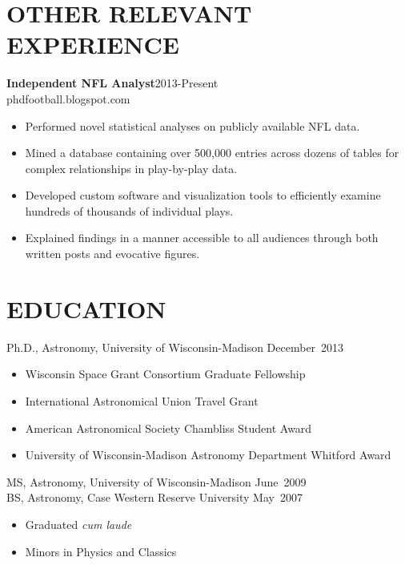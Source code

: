 \documentclass[11pt, margin]{res_hacked_long}
\begin{document}
\begin{resume}
\section{OTHER RELEVANT EXPERIENCE}
{\bf Independent NFL Analyst}\hfill\mbox{2013-Present}\\
phdfootball.blogspot.com
                  \vspace* {0.01 in}\begin{itemize} \itemsep -2pt
                    \item Performed novel statistical analyses on
                      publicly available NFL data.
                    \item Mined a database containing
                      over 500,000 entries across dozens of tables for complex relationships
                      in play-by-play data. 
                    \item Developed custom software and visualization
                      tools to efficiently examine hundreds
                      of thousands of individual plays. 
                    \item Explained findings in a manner accessible to all audiences through both written posts and evocative figures.
                  \end{itemize} 
\vspace{-0.1 in}

\section{EDUCATION} 
Ph.D., Astronomy, University of Wisconsin-Madison \hfill\mbox{December 2013}
\begin{itemize} \itemsep -2pt
\item Wisconsin Space Grant Consortium Graduate Fellowship
\item International Astronomical Union Travel Grant
\item American Astronomical Society Chambliss Student Award
\item University of Wisconsin-Madison Astronomy Department Whitford Award
\end{itemize}
\vspace{-0.15 in}
MS, Astronomy, University of Wisconsin-Madison \hfill\mbox{June 2009}\\
BS, Astronomy, Case Western Reserve University \hfill\mbox{May 2007} 
\begin{itemize} \itemsep -2pt
\item Graduated {\it cum laude}
\item Minors in Physics and Classics
\end{itemize}
\vspace{-0.15 in}

\end{resume}
\end{document}
